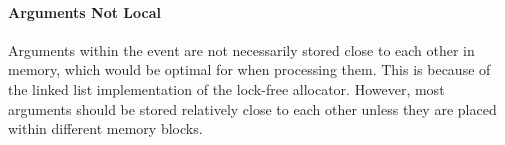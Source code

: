 \paragraph{Arguments Not Local}
Arguments within the event are not necessarily stored close to each other in memory, which would be optimal for when processing them. This is because of the linked list implementation of the lock-free allocator.
However, most arguments should be stored relatively close to each other unless they are
placed within different memory blocks.

